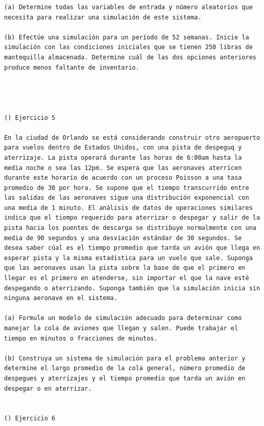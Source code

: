 \begin{verbatim}
(a) Determine todas las variables de entrada y número aleatorios que necesita para realizar una simulación de este sistema.

(b) Efectúe una simulación para un período de 52 semanas. Inicie la simulación con las condiciones iniciales que se tienen 250 libras de mantequilla almacenada. Determine cuál de las dos opciones anteriores produce menos faltante de inventario.




() Ejercicio 5

En la ciudad de Orlando se está considerando construir otro aeropuerto para vuelos dentro de Estados Unidos, con una pista de despeguq y aterrizaje. La pista operará durante las horas de 6:00am hasta la media noche o sea las 12pm. Se espera que las aeronaves aterricen durante este horario de acuerdo con un proceso Poisson a una tasa promedio de 30 por hora. Se supone que el tiempo transcurrido entre las salidas de las aeronaves sigue una distribución exponencial con una media de 1 minuto. El análisis de datos de operaciones similares indica que el tiempo requerido para aterrizar o despegar y salir de la pista hacia los puentes de descarga se distribuye normalmente con una media de 90 segundos y una desviación estándar de 30 segundos. Se desea saber cúal es el tiempo promedio que tarda un avión que llega en esperar pista y la misma estadística para un vuelo que sale. Suponga que las aeronaves usan la pista sobre la base de que el primero en llegar es el primero en atenderse, sin importar el que la nave esté despegando o aterrizando. Suponga también que la simulación inicia sin ninguna aeronave en el sistema. 

(a) Formule un modelo de simulación adecuado para determinar como manejar la cola de aviones que llegan y salen. Puede trabajar el tiempo en minutos o fracciones de minutos.

(b) Construya un sistema de simulación para el problema anterior y determine el largo promedio de la cola general, número promedio de despegues y aterrizajes y el tiempo promedio que tarda un avión en despegar o en aterrizar.


() Ejercicio 6


\end{verbatim}
